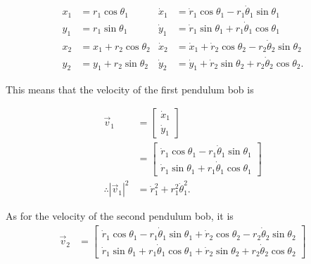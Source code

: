\documentclass[12pt,a4paper,portrait]{article}
\begin{document}
\begin{align*}
	x_1 &= r_1 \cos{\theta_1} & \dot{x}_1 &= \dot{r}_1 \cos{\theta_1} - r_1 \dot{\theta}_1 \sin{\theta_1}\\
	y_1 &= r_1 \sin{\theta_1} & \dot{y}_1 &= \dot{r}_1\sin{\theta_1} + r_1\dot{\theta}_1 \cos{\theta_1} \\
	x_2 &= x_1 + r_2\cos{\theta_2} & \dot{x}_2 &= \dot{x}_1 + \dot{r}_2\cos{\theta_2} - r_2\dot{\theta}_2 \sin{\theta_2} \\
	y_2 &= y_1 + r_2\sin{\theta_2} & \dot{y}_2 &= \dot{y}_1 + \dot{r}_2\sin{\theta_2} + r_2\dot{\theta}_2 \cos{\theta_2}.
\end{align*}

This means that the velocity of the first pendulum bob is

\begin{align*}
	\vec{v}_1 &= \begin{bmatrix}
		\dot{x}_1 \\
		\dot{y}_1
	\end{bmatrix} \\
	&= \begin{bmatrix}
		\dot{r}_1 \cos{\theta_1} - r_1 \dot{\theta}_1 \sin{\theta_1} \\
		\dot{r}_1\sin{\theta_1} + r_1\dot{\theta}_1 \cos{\theta_1}
	\end{bmatrix} \\
	\therefore |\vec{v}_1|^2 &= \dot{r}_1^2 + r_1^2 \dot{\theta}_1^2. 
\end{align*}

As for the velocity of the second pendulum bob, it is
\begin{align*}
	\vec{v}_2 &= \begin{bmatrix}
		\dot{r}_1 \cos{\theta_1} - r_1 \dot{\theta}_1 \sin{\theta_1} + \dot{r}_2\cos{\theta_2} - r_2\dot{\theta}_2 \sin{\theta_2} \\
		\dot{r}_1\sin{\theta_1} + r_1\dot{\theta}_1 \cos{\theta_1} + \dot{r}_2\sin{\theta_2} + r_2\dot{\theta}_2 \cos{\theta_2}
	\end{bmatrix}
\end{align*}
\end{document}
